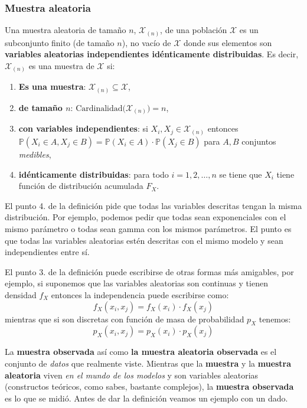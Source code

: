 \documentclass[
]{book}
\newenvironment{Definicion}
{\begin{mdframed}[
  linecolor=definicioncolor,
  skipabove=12pt,
  skipbelow=12pt,
  roundcorner=20pt,
  splittopskip=2\topsep]}
{\end{mdframed}}
\begin{document}
\begin{Definicion}
\hypertarget{muestra-aleatoria}{%
\subsubsection{Muestra aleatoria}\label{muestra-aleatoria}}

Una muestra aleatoria de tamaño \(n\), \(\mathcal{X}_{(n)}\), de una
población \(\mathcal{X}\) es un subconjunto finito (de tamaño \(n\)), no
vacío de \(\mathcal{X}\) donde sus elementos son \textbf{variables
aleatorias independientes idénticamente distribuidas}. Es decir,
\(\mathcal{X}_{(n)}\) es una muestra de \(\mathcal{X}\) si:

\begin{enumerate}
\def\labelenumi{\arabic{enumi}.}
\item
  \textbf{Es una muestra}: \(\mathcal{X}_{(n)} \subseteq \mathcal{X}\),
\item
  \textbf{de tamaño \(n\)}:
  \(\textrm{Cardinalidad}\Big( \mathcal{X}_{(n)} \Big) = n\),
\item
  \textbf{con variables independientes}: si
  \(X_i, X_j \in \mathcal{X}_{(n)}\) entonces
  \(\mathbb{P}(X_i \in A , X_j \in B) = \mathbb{P}(X_i \in A)\cdot\mathbb{P}(X_j \in B)\)
  para \(A,B\) conjuntos \emph{medibles},
\item
  \textbf{idénticamente distribuidas}: para todo \(i = 1,2,\dots, n\) se
  tiene que \(X_i\) tiene función de distribución acumulada \(F_X\).
\end{enumerate}
\end{Definicion}

El punto 4. de la definición pide que todas las variables descritas tengan la misma distribución. Por ejemplo, podemos pedir que todas sean exponenciales con el mismo parámetro o todas sean gamma con los mismos parámetros. El punto es que todas las variables aleatorias estén descritas con el mismo modelo y sean independientes entre sí.

El punto 3. de la definición puede escribirse de otras formas más amigables, por ejemplo, si suponemos que las variables aleatorias son continuas y tienen densidad \(f_X\) entonces la independencia puede escribirse como:
\[
f_X(x_i, x_j) = f_X(x_i) \cdot f_X(x_j)
\]
mientras que si son discretas con función de masa de probabilidad \(p_X\) tenemos:
\[
p_X(x_i, x_j) = p_X(x_i) \cdot p_X(x_j)
\]

La \textbf{muestra observada} así como \textbf{la muestra aleatoria observada} es el conjunto de \emph{datos} que realmente viste. Mientras que la \textbf{muestra} y la \textbf{muestra aleatoria} viven \emph{en el mundo de los modelos} y son variables aleatorias (constructos teóricos, como sabes, bastante complejos), la \textbf{muestra observada} es lo que se midió. Antes de dar la definición veamos un ejemplo con un dado.
\end{document}
